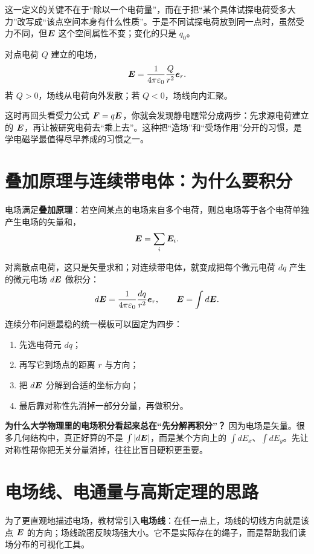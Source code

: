 \documentclass[lang=cn,11pt]{elegantbook}
\begin{document}
这一定义的关键不在于“除以一个电荷量”，而在于把“某个具体试探电荷受多大力”改写成“该点空间本身有什么性质”。于是不同试探电荷放到同一点时，虽然受力不同，但\(\vb*{E}\) 这个空间属性不变；变化的只是 \(q_0\)。

对点电荷 \(Q\) 建立的电场，
\[
\vb*{E}
=\frac{1}{4\pi\varepsilon_0}\frac{Q}{r^2}\vb*{e}_r.
\]
若 \(Q>0\)，场线从电荷向外发散；若 \(Q<0\)，场线向内汇聚。

\begin{remark}
这时再回头看受力公式 \(\vb*{F}=q\vb*{E}\)，你就会发现静电题常分成两步：先求源电荷建立的 \(\vb*{E}\)，再让被研究电荷去“乘上去”。这种把“造场”和“受场作用”分开的习惯，是学电磁学最值得尽早养成的习惯之一。
\end{remark}

\section{叠加原理与连续带电体：为什么要积分}

电场满足\textbf{叠加原理}：若空间某点的电场来自多个电荷，则总电场等于各个电荷单独产生电场的矢量和，
\[
\vb*{E}=\sum_i \vb*{E}_i.
\]

对离散点电荷，这只是矢量求和；对连续带电体，就变成把每个微元电荷 \(dq\) 产生的微元电场 \(d\vb*{E}\) 做积分：
\[
d\vb*{E}
=\frac{1}{4\pi\varepsilon_0}\frac{dq}{r^2}\vb*{e}_r,
\qquad
\vb*{E}=\int d\vb*{E}.
\]

连续分布问题最稳的统一模板可以固定为四步：
\begin{enumerate}
  \item 先选电荷元 \(dq\)；
  \item 再写它到场点的距离 \(r\) 与方向；
  \item 把 \(d\vb*{E}\) 分解到合适的坐标方向；
  \item 最后靠对称性先消掉一部分分量，再做积分。
\end{enumerate}

\begin{note}
\textbf{为什么大学物理里的电场积分看起来总在“先分解再积分”？} 因为电场是矢量。很多几何结构中，真正好算的不是 \(\int \abs{d\vb*{E}}\)，而是某个方向上的 \(\int dE_x\)、\(\int dE_y\)。先让对称性帮你把无关分量消掉，往往比盲目硬积更重要。
\end{note}

\section{电场线、电通量与高斯定理的思路}

为了更直观地描述电场，教材常引入\textbf{电场线}：在任一点上，场线的切线方向就是该点 \(\vb*{E}\) 的方向；场线疏密反映场强大小。它不是实际存在的绳子，而是帮助我们读场分布的可视化工具。
\end{document}
